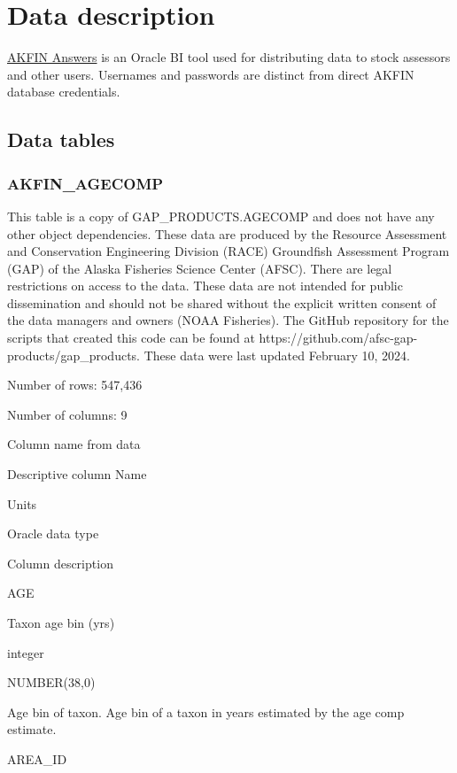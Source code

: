 \documentclass[
  letterpaper,
  oneside,
  open=any]{scrbook}
\begin{document}
\hypertarget{data-description-2}{%
\chapter{Data description}\label{data-description-2}}

\href{https://akfin.psmfc.org/akfin-answers/}{AKFIN Answers} is an
Oracle BI tool used for distributing data to stock assessors and other
users. Usernames and passwords are distinct from direct AKFIN database
credentials.

\hypertarget{data-tables-1}{%
\section{Data tables}\label{data-tables-1}}

\hypertarget{akfin_agecomp}{%
\subsection{AKFIN\_AGECOMP}\label{akfin_agecomp}}

This table is a copy of GAP\_PRODUCTS.AGECOMP and does not have any
other object dependencies. These data are produced by the Resource
Assessment and Conservation Engineering Division (RACE) Groundfish
Assessment Program (GAP) of the Alaska Fisheries Science Center (AFSC).
There are legal restrictions on access to the data. These data are not
intended for public dissemination and should not be shared without the
explicit written consent of the data managers and owners (NOAA
Fisheries). The GitHub repository for the scripts that created this code
can be found at https://github.com/afsc-gap-products/gap\_products.
These data were last updated February 10, 2024.

Number of rows: 547,436

Number of columns: 9

Column name from data

Descriptive column Name

Units

Oracle data type

Column description

AGE

Taxon age bin (yrs)

integer

NUMBER(38,0)

Age bin of taxon. Age bin of a taxon in years estimated by the age comp
estimate.

AREA\_ID
\end{document}
